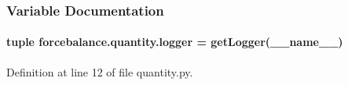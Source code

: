 \subsubsection{Variable Documentation}
\hypertarget{namespaceforcebalance_1_1quantity_a1d4f48df65583ff66457beb51ef5c361}{
\paragraph[{logger}]{\setlength{\rightskip}{0pt plus 5cm}tuple forcebalance.\-quantity.\-logger = get\-Logger(\-\_\-\-\_\-name\-\_\-\-\_\-)}}\label{namespaceforcebalance_1_1quantity_a1d4f48df65583ff66457beb51ef5c361}


Definition at line 12 of file quantity.\-py.

